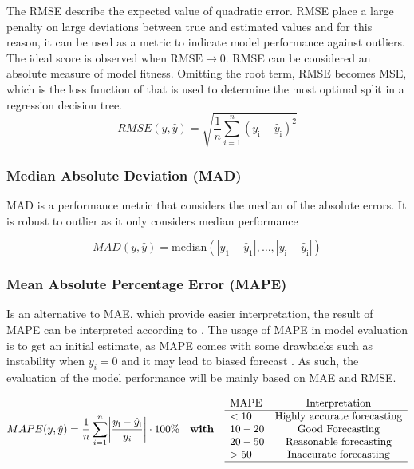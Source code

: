 The RMSE describe the expected value of quadratic error. RMSE place a large penalty on large deviations between true and estimated values and for this reason, it can be used as a metric to indicate model performance against outliers. The ideal score is observed when $\text{RMSE} \rightarrow 0$. RMSE can be considered an absolute measure of model fitness. Omitting the root term, RMSE becomes MSE, which is the loss function of  that is used to determine the most optimal split in a regression decision tree.\\

\begin{equation}\label{eqn:RMSE}
    RMSE(y,\hat{y}) = \sqrt{\frac{1}{n}\sum_{i=1}^{n} (y_{\text{i}} - \hat{y}_{\text{i}})^2} 
\end{equation}

\subsubsection*{Median Absolute Deviation (MAD)}\label{sec:MAD} 

MAD is a performance metric that considers the median of the absolute errors. It is robust to outlier as it only considers median performance

\begin{equation}\label{eqn:MAD}
    MAD(y,\hat{y}) =  \text{median} (|y_{\text{1}} - \hat{y}_{\text{1}}|,\dots,|y_{\text{i}} - \hat{y}_{\text{i}}|)
\end{equation}

\subsubsection*{Mean Absolute Percentage Error (MAPE)}

Is an alternative to MAE, which provide easier interpretation, the result of MAPE can be interpreted according to  . The usage of MAPE in model evaluation is to get an initial estimate, as MAPE comes with some drawbacks such as instability when $y_i = 0$ and it may lead to biased forecast . As such, the evaluation of the model performance will be mainly based on MAE and RMSE.    

\begin{equation}\label{eqn:MAPE}
    MAPE(y,\hat{y}) = \frac{1}{n}\sum_{i=1}^{n} \biggl|\frac{y_{\text{i}} - \hat{y}_{\text{i}}}{y_i}\biggr| \cdot 100\%  \quad \textbf{with} \quad \begin{array}{l c}
        \text{MAPE} & \text{Interpretation}\\
        \hline
        < 10 & \text{Highly accurate forecasting} \\
        10-20 & \text{Good Forecasting} \\
        20-50 & \text{Reasonable forecasting}\\
        > 50 & \text{Inaccurate forecasting} \\
        \hline
    \end{array}
\end{equation}

